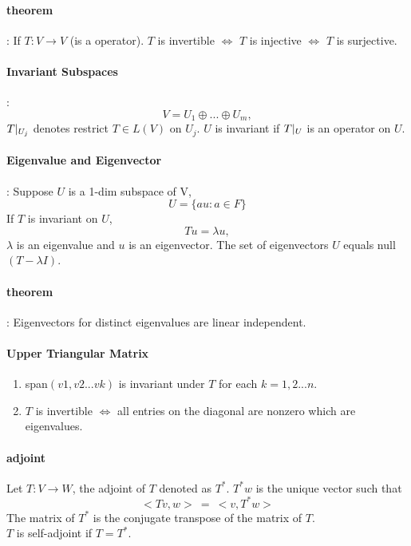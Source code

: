 \documentclass[letterpaper]{article}
\begin{document}
\paragraph{theorem}:
If $T: V \to V$ (is a operator). $T$ is invertible $\iff$ $T$ is injective $\iff$ $T$ is surjective. 
\paragraph{Invariant Subspaces}:
\begin{displaymath}
V=U_1\oplus...\oplus U_m,
\end{displaymath}
$T\arrowvert_{U_j}$ denotes restrict $T \in L(V)$ on $U_j$. $U$ is invariant if $T\arrowvert_{U}$ is an operator on $U$.

\paragraph{Eigenvalue and Eigenvector}:
Suppose $U$ is a 1-dim subspace of V,
\begin{displaymath}
U=\{au:a \in F\}
\end{displaymath}
If $T$ is invariant on $U$,
\begin{displaymath}
Tu=\lambda u,
\end{displaymath}
$\lambda$ is an eigenvalue and $u$ is an eigenvector. The set of eigenvectors $U$ equals null$(T-\lambda I)$.
\paragraph{theorem}: Eigenvectors for distinct eigenvalues are linear independent.


\paragraph{Upper Triangular Matrix}
\begin{enumerate}
	\item
	span$(v1,v2...vk)$ is invariant under $T$ for each $k = 1,2...n$.
	\item
	$T$ is invertible $\iff$ all entries on the diagonal are nonzero which are eigenvalues.
\end{enumerate}

\paragraph{adjoint}
Let $T: V \to W$, the adjoint of $T$ denoted as $T^*$. $T^*w$ is the unique vector such that
\begin{displaymath}
<Tv,w>\ =\ <v,T^*w>
\end{displaymath}
The matrix of $T^*$ is the conjugate transpose of the matrix of $T$.\\
$T$ is self-adjoint if $T=T^*$.
\end{document}

